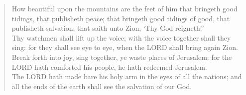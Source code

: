 \documentclass[MAIN]{subfiles}
\begin{document}
\begin{verse}
How beautiful upon the mountains are the feet of him that bringeth good tidings, that publisheth peace; that bringeth good tidings of good, that publisheth salvation; that saith unto {\sc Zion}, `Thy God reigneth!'\\
Thy watchmen shall lift up the voice; with the voice together shall they sing: for they shall see eye to eye, when the {\hge LORD} shall bring again {\sc Zion}.\\
Break forth into joy, sing together, ye waste places of {\sc Jerusalem}: for the {\hge LORD} hath comforted his people, he hath redeemed {\sc Jerusalem}.\\
The {\hge LORD} hath made bare his holy arm in the eyes of all the nations; and all the ends of the earth shall see the salvation of our God.
\end{verse}
\end{document}
